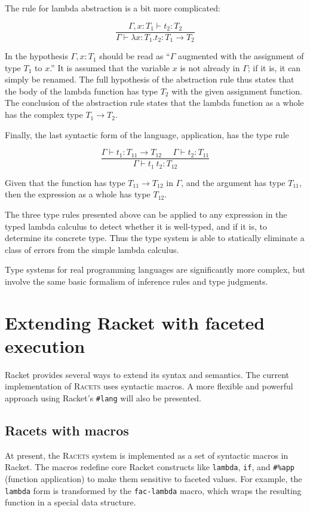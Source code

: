 \documentclass{article}
\begin{document}
The rule for lambda abstraction is a bit more complicated:

\[
\frac{\Gamma, x : T_1 \vdash t_2 : T_2}
{\Gamma \vdash \lambda x : T_1 . t_2 : T_1 \to T_2}
\]

In the hypothesis $\Gamma, x : T_1$ should be read as ``$\Gamma$ augmented with the assignment of type $T_1$ to $x$.'' It is assumed that the variable $x$ is not already in $\Gamma$; if it is, it can simply be renamed. The full hypothesis of the abstraction rule thus states that the body of the lambda function has type $T_2$ with the given assignment function. The conclusion of the abstraction rule states that the lambda function as a whole has the complex type $T_1 \to T_2$.

Finally, the last syntactic form of the language, application, has the type rule

\[
\frac{\Gamma \vdash t_1 : T_{11} \to T_{12}\ \ \ \ \ \ \Gamma \vdash t_2 : T_{11}}
{\Gamma \vdash t_1\ t_2 : T_{12}}
\]

Given that the function has type $T_{11} \to T_{12}$ in $\Gamma$, and the argument has type $T_{11}$, then the expression as a whole has type $T_{12}$.

The three type rules presented above can be applied to any expression in the typed lambda calculus to detect whether it is well-typed, and if it is, to determine its concrete type. Thus the type system is able to statically eliminate a class of errors from the simple lambda calculus.

Type systems for real programming languages are significantly more complex, but involve the same basic formalism of inference rules and type judgments.



\section{Extending Racket with faceted execution\label{sec:lang}}
Racket provides several ways to extend its syntax and semantics. The current implementation of \textsc{Racets} uses syntactic macros. A more flexible and powerful approach using Racket's \texttt{\#lang} will also be presented.

\subsection{Racets with macros}
At present, the \textsc{Racets} system is implemented as a set of syntactic macros in Racket. The macros redefine core Racket constructs like \texttt{lambda}, \texttt{if}, and \texttt{\#\%app} (function application) to make them sensitive to faceted values. For example, the \texttt{lambda} form is transformed by the \texttt{fac-lambda} macro, which wraps the resulting function in a special data structure.
\end{document}
